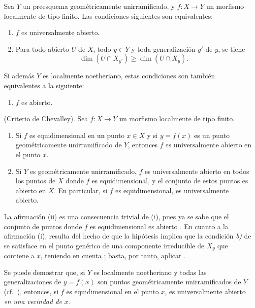 \begin{corollary}[14.4.3]
\label{IV.14.4.3}
Sea $Y$ un preesquema geométricamente unirramificado, y $f:X\to Y$ un morfismo localmente de tipo finito.
Las condiciones siguientes son equivalentes:
\begin{enumerate}[label=\emph{\alph*)}]
  \item $f$ es universalmente abierto.
  \item Para todo abierto $U$ de $X$, todo $y\in Y$ y toda generalización $y'$ de $y$, se tiene
    \[
  \dim(U\cap X_{y'})\geq\dim(U\cap X_y).
  \]
\end{enumerate}
Si además $Y$ es localmente noetheriano, estas condiciones son también equivalentes a la siguiente:
\begin{enumerate}[label=\emph{\alph*)}]
  \item[\emph{c)}] $f$ es abierto.
\end{enumerate}
\end{corollary}

\begin{corollary}[14.4.4]
\label{IV.14.4.4}
(Criterio de Chevalley).
Sea $f:X\to Y$ un morfismo localmente de tipo finito.
\begin{enumerate}[label=\textup{(\roman*)}]
  \item Si $f$ es equidimensional en un punto $x\in X$  y si $y=f(x)$ es un punto geométricamente unirramificado de $Y$, entonces $f$ es universalmente abierto en el punto $x$.
  \item Si $Y$ es geométricamente unirramificado, $f$ es universalmente abierto en todos los puntos de $X$ donde $f$ es equidimensional, y el conjunto de estos puntos es abierto en $X$.
 En particular, si $f$ es equidimensional, es universalmente abierto.
\end{enumerate}
\end{corollary}

La afirmación (ii) es una consecuencia trivial de (i), pues ya se sabe que el conjunto de puntos donde $f$ es equidimensional es abierto .
En cuanto a la afirmación (i), resulta del hecho de que la hipótesis implica que la condición \emph{b)} de  se satisface en el punto genérico de una componente irreducible de $X_y$ que contiene a $x$, teniendo en cuenta ; basta, por tanto, aplicar .

\begin{remark}[14.4.5]
\label{IV.14.4.5}
Se puede demostrar que, si $Y$ es localmente noetheriano y todas las generalizaciones de $y=f(x)$ son puntos geométricamente unirramificados de $Y$ (cf.\ ), entonces, si $f$ es equidimensional en el punto $x$, es universalmente abierto \emph{en una vecindad de $x$}.
\end{remark}




